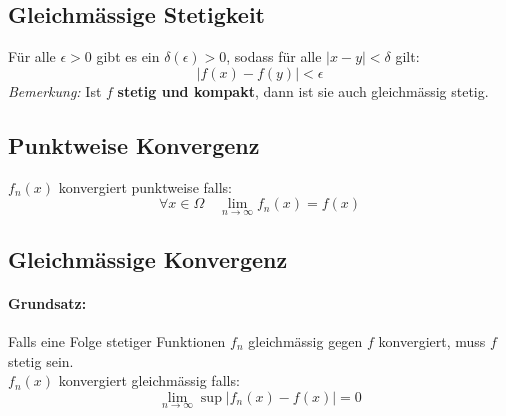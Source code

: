 \subsection{Gleichm{\"a}ssige Stetigkeit}
F{\"u}r alle $\epsilon > 0$ gibt es ein $\delta(\epsilon) >0$, sodass f{\"u}r alle $|x-y|<\delta$ gilt:
\begin{equation*}
	|f(x)-f(y)| < \epsilon
\end{equation*}
\emph{Bemerkung:} Ist $f$ \textbf{stetig und kompakt}, dann ist sie auch gleichm{\"a}ssig stetig.

\subsection{Punktweise Konvergenz}

$f_n(x)$ konvergiert punktweise falls:
\begin{equation*}
	\forall x\in \Omega \quad \lim_{n\rightarrow\infty}f_n(x) = f(x)
\end{equation*}

\subsection{Gleichm{\"a}ssige Konvergenz}

\paragraph{Grundsatz:} Falls eine Folge stetiger Funktionen $f_n$ gleichm{\"a}ssig gegen $f$ konvergiert, muss $f$ stetig sein.\\

$f_n(x)$ konvergiert gleichm{\"a}ssig falls:
\begin{equation*}
	\lim_{n\rightarrow\infty} \sup|f_n(x) - f(x)| = 0
\end{equation*}

